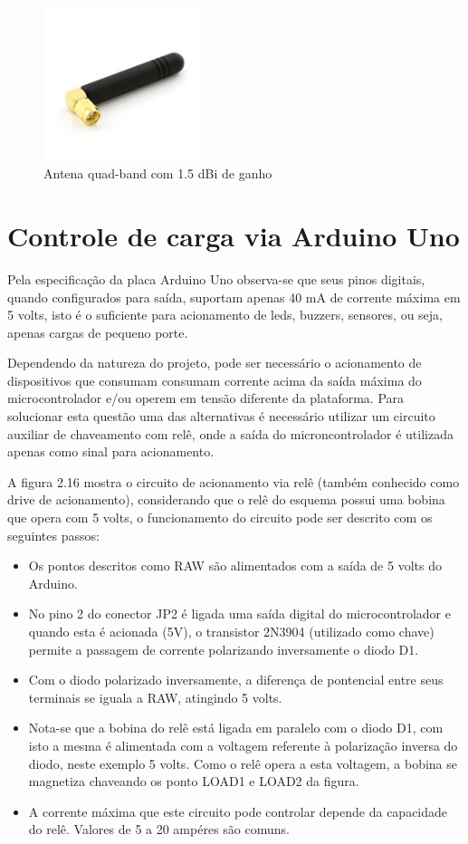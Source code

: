 \begin{figure}[h!]
			\centering
			\includegraphics[width=0.4\textwidth]{figures/antena.jpg}
			\caption{Antena quad-band com 1.5 dBi de ganho}
			\label{1}
\end{figure}

\section{Controle de carga via Arduino Uno}

Pela especificação da placa Arduino Uno observa-se que seus pinos digitais, quando configurados para saída, suportam apenas 40 mA de corrente máxima em 5 volts, isto é o suficiente para acionamento de leds, buzzers, sensores, ou seja, apenas cargas de pequeno porte.

Dependendo da natureza do projeto, pode ser necessário o acionamento de dispositivos que consumam consumam corrente acima da saída máxima do microcontrolador e/ou operem em tensão diferente da plataforma. Para solucionar esta questão uma das alternativas é necessário utilizar um circuito auxiliar de chaveamento com relê, onde a saída do microncontrolador é utilizada apenas como sinal para acionamento.

A figura 2.16 mostra o circuito de acionamento via relê (também conhecido como drive de acionamento), considerando que o relê do esquema possui uma bobina que opera com 5 volts, o funcionamento do circuito pode ser descrito com os seguintes passos: 

\begin{itemize}
	\item Os pontos descritos como RAW são alimentados com a saída de 5 volts do Arduino.
	\item No pino 2 do conector JP2 é ligada uma saída digital do microcontrolador e quando esta é acionada (5V), o transistor 2N3904 (utilizado como chave) permite a passagem de corrente polarizando inversamente o diodo D1.
	\item Com o diodo polarizado inversamente, a diferença de pontencial entre seus terminais se iguala a RAW, atingindo 5 volts.
	\item Nota-se que a bobina do relê está ligada em paralelo com o diodo D1, com isto a mesma é alimentada com a voltagem referente à polarização inversa do diodo, neste exemplo 5 volts. Como o relê opera a esta voltagem, a bobina se magnetiza chaveando os ponto LOAD1 e LOAD2 da figura.
	\item A corrente máxima que este circuito pode controlar depende da capacidade do relê. Valores de 5 a 20 ampéres são comuns.
\end{itemize}

